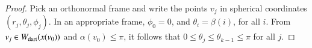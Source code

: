 \begin{proof}  
%
%
%
Pick an orthonormal frame and write the points $v_j$ in spherical coordinates $(r_j,\theta_j,\phi_j)$.  In an appropriate frame, $\phi_0=0$, and $\theta_i=\beta(i)$, for all $i$.  From $v_j\in W_{\text{dart}}(x(v_0))$ and $\alpha(v_0)\le\pi$, it follows that $0\le\theta_j\le\theta_{k-1}\le\pi$ for all $j$.


\end{proof}
